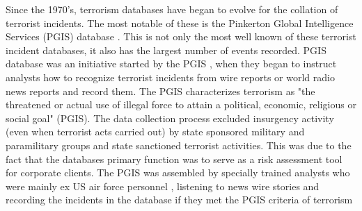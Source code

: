 Since the 1970's, terrorism databases have began to evolve for the collation of terrorist incidents. The most notable of these is the Pinkerton Global Intelligence Services (PGIS) database \citep{dugan2006first}. This is not only the most well known of these terrorist incident databases, it also has the largest number of events recorded. PGIS database was an initiative started by the PGIS \citep{sheehan2012assessing}, when they began to instruct analysts how to recognize terrorist incidents from wire reports or world radio news reports and record them. The PGIS characterizes terrorism as "the threatened or actual use of illegal force to attain a political, economic, religious or social goal" (PGIS). The data collection process excluded insurgency activity (even when terrorist acts carried out) by state sponsored military and paramilitary groups and state sanctioned terrorist activities. This was due to the fact that the databases primary function was to serve as a risk assessment tool for corporate clients. The PGIS was assembled by specially trained analysts who were mainly ex US air force personnel \citep{fivethirtyeightGTD2015}, listening to news wire stories and recording the incidents in the database if they met the PGIS criteria of terrorism 

